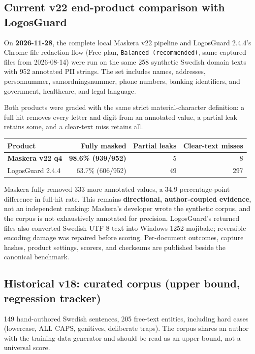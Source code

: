 \documentclass[10pt,a4paper]{article}
\newcommand{\pkg}[1]{\texttt{#1}}
\begin{document}
\subsection{Current v22 end-product comparison with LogosGuard}

On \textbf{2026-11-28}, the complete local Maskera v22 pipeline and
LogosGuard 2.4.4's Chrome file-redaction flow (Free plan,
\pkg{Balanced (recommended)}, same captured files from 2026-08-14) were run on
the same 258 synthetic Swedish domain texts with 952 annotated PII strings. The
set includes names, addresses, personnummer, samordningsnummer, phone numbers,
banking identifiers, and government, healthcare, and legal language.

Both products were graded with the same strict material-character definition:
a full hit removes every letter and digit from an annotated value, a partial
leak retains some, and a clear-text miss retains all.

\begin{table}[H]
\centering
\begin{tabular}{lrrr}
\toprule
Product & Fully masked & Partial leaks & Clear-text misses \\
\midrule
\textbf{Maskera v22 q4} & \textbf{98.6\% (939/952)} & 5 & 8 \\
LogosGuard 2.4.4 & 63.7\% (606/952) & 49 & 297 \\
\bottomrule
\end{tabular}
\end{table}

Maskera fully removed 333 more annotated values, a 34.9 percentage-point
difference in full-hit rate. This remains \textbf{directional,
author-coupled evidence}, not an independent ranking: Maskera's developer
wrote the synthetic corpus, and the corpus is not exhaustively annotated for
precision. LogosGuard's returned files also converted Swedish UTF-8 text into
Windows-1252 mojibake; reversible encoding damage was repaired before scoring.
Per-document outcomes, capture hashes, product settings, scorers, and checksums
are published beside the canonical benchmark.

\subsection{Historical v18: curated corpus (upper bound, regression tracker)}

149 hand-authored Swedish sentences, 205 free-text entities, including hard
cases (lowercase, ALL CAPS, genitives, deliberate traps). The corpus shares
an author with the training-data generator and should be read as an upper
bound, not a universal score.
\end{document}

